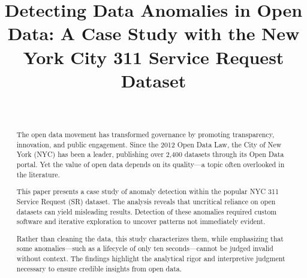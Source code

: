 \documentclass[linenumber]{jdsart}
\begin{document}



\begin{frontmatter}
  
\title{Detecting Data Anomalies in Open Data: A Case Study with the New
York City 311 Service Request Dataset}

\author[1]{~}
\address[1]{, }



\begin{abstract}
The open data movement has transformed governance by promoting transparency, 
innovation, and public engagement. Since the 2012 Open Data Law, the City of 
New York (NYC) has been a leader, publishing over 2,400 datasets through its 
Open Data portal. Yet the value of open data depends on its quality—a topic 
often overlooked in the literature.  

This paper presents a case study of anomaly detection within the popular NYC 311 
Service Request (\textsc{SR}) dataset. The analysis reveals that 
uncritical reliance on open datasets 
can yield misleading results. Detection of these anomalies required custom software and iterative 
exploration to uncover patterns not immediately evident.  

Rather than cleaning the data, this study characterizes them, while emphasizing 
that some anomalies—such as a lifecycle of only ten seconds—cannot be judged 
invalid without context. The findings highlight the analytical rigor 
and interpretive judgment necessary to ensure credible insights from open data.
\end{abstract}

\begin{keywords} %
\end{keywords}

\end{frontmatter}

\end{document}

